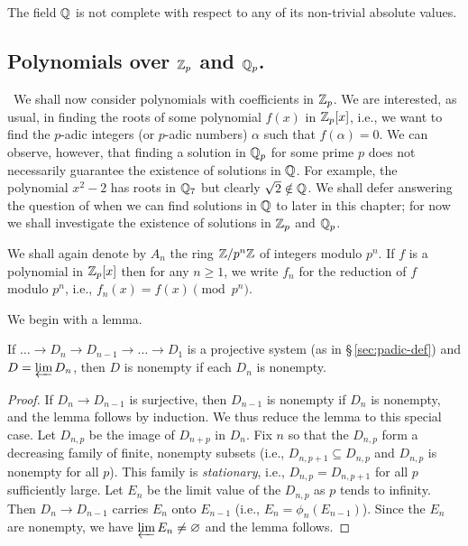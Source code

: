 \begin{lemma}\label{lem:ostrowski-lemma}
    The field \(\Rationals\) is not complete with respect to any of its non-trivial absolute values.
\end{lemma}


\subsection{Polynomials over \(\Integers_p\) and \(\Rationals_p\).}~We shall now consider polynomials with coefficients in \(\Integers_p\). We are interested, as usual, in finding the roots of some polynomial \(f(x)\) in \(\Integers_p[x]\), i.e., we want to find the \(p\)-adic integers (or \(p\)-adic numbers) \(\alpha\) such that \(f(\alpha) = 0\). We can observe, however, that finding a solution in \(\Rationals_p\) for some prime \(p\) does not necessarily guarantee the existence of solutions in \(\Rationals\). For example, the polynomial \(x^2 - 2\) has roots in \(\Rationals_7\) but clearly \(\sqrt{2} \notin \Rationals\). We shall defer answering the question of when we can find solutions in \(\Rationals\) to later in this chapter; for now we shall investigate the existence of solutions in \(\Integers_p\) and \(\Rationals_p\).\label{sec:polynomials-over-zp}

We shall again denote by \(A_n\) the ring \(\Integers / p^n \Integers\) of integers modulo \(p^n\). If \(f\) is a polynomial in \(\Integers_p[x]\) then for any \(n \geq 1\), we write \(f_n\) for the reduction of \(f\) modulo \(p^n\), i.e., \(f_n(x) = f(x) \pmod{p^n}\).

We begin with a lemma.

\begin{lemma}
    {\normalfont\cite[p.~13]{serre2012course}}
    If \(\dots \to D_n \to D_{n - 1} \to \dots \to D_1\) is a projective system (as in {\normalfont \S\,\ref{sec:padic-def}}) and \(D = \varprojlim D_n\), then \(D\) is nonempty if each \(D_n\) is nonempty.
\end{lemma}

\begin{proof}
    If \(D_n \to D_{n-1}\) is surjective, then \(D_{n-1}\) is nonempty if \(D_n\) is nonempty, and the lemma follows by induction. We thus reduce the lemma to this special case. Let \(D_{n, p}\) be the image of \(D_{n+p}\) in \(D_n\). Fix \(n\) so that the \(D_{n,p}\) form a decreasing family of finite, nonempty subsets (i.e., \(D_{n,p+1} \subseteq D_{n,p}\) and \(D_{n,p}\) is nonempty for all \(p\)). This family is \emph{stationary}, i.e., \(D_{n,p} = D_{n,p+1}\) for all \(p\) sufficiently large. Let \(E_n\) be the limit value of the \(D_{n,p}\) as \(p\) tends to infinity. Then \(D_n \to D_{n-1}\) carries \(E_n\) onto \(E_{n-1}\) (i.e., \(E_n = \phi_n(E_{n-1})\)). Since the \(E_n\) are nonempty, we have \(\varprojlim E_n \neq \emptyset\) and the lemma follows.
\end{proof}

